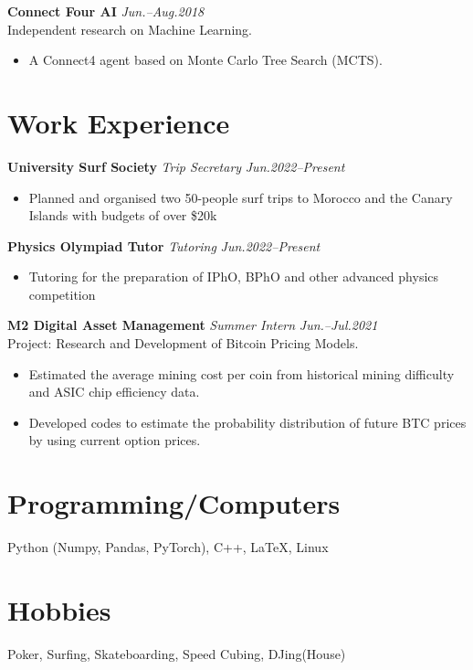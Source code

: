\documentclass[11pt,a4paper,roman]{moderncv}        %
\begin{document}
\textbf{Connect Four AI} \hfill \textit{Jun.--Aug.2018}
\vspace*{1mm}\\
{Independent research on Machine Learning.}
\vspace*{1mm}
\begin{itemize}
	\item A Connect4 agent based on Monte Carlo Tree Search (MCTS).
\end{itemize}

\section{Work Experience}

\textbf{University Surf Society} \textit{Trip Secretary} \hfill \textit{Jun.2022--Present}
\vspace*{1mm}
\begin{itemize}
	\item Planned and organised two 50-people surf trips to Morocco and the Canary Islands with budgets of over \$20k
\end{itemize}

\textbf{Physics Olympiad Tutor} \textit{Tutoring} \hfill \textit{Jun.2022--Present}
\vspace*{1mm}
\begin{itemize}
	\item Tutoring for the preparation of IPhO, BPhO and other advanced physics competition
\end{itemize}

\textbf{M2 Digital Asset Management} \textit{Summer Intern} \hfill \textit{Jun.--Jul.2021}
\vspace*{1mm}\\
{Project: Research and Development of Bitcoin Pricing Models.}
\vspace*{1mm}
\begin{itemize}
	\item Estimated the average mining cost per coin from historical mining difficulty and ASIC chip efficiency data.
	\item Developed codes to estimate the probability distribution of future BTC prices by using current option prices.
\end{itemize}

\section{Programming/Computers}
 {Python (Numpy, Pandas, PyTorch), C++, \LaTeX, Linux}

\section{Hobbies}
 {Poker, Surfing, Skateboarding, Speed Cubing, DJing(House)}
\end{document}
